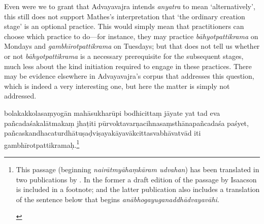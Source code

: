 \documentclass[naipra.tex]{subfiles}
\begin{document}
\begin{sanskrit}
{\begin{english}
	Even were we to grant that Advayavajra intends \emph{anyatra} to mean `alternatively', this still does not support Mathes's interpretation that `the ordinary creation stage' is an optional practice.
	This would simply mean that practitioners can choose which practice to do—for instance, they may practice \emph{bāhyotpattikrama} on Mondays and \emph{gambhīrotpattikrama} on Tuesdays; but that does not tell us whether or not \emph{bāhyotpattikrama} is a necessary prerequisite for the subsequent stages, much less about the kind initiation required to engage in these practices.
	There may be evidence elsewhere in Advayavajra's corpus that addresses this question, which is indeed a very interesting one, but here the matter is simply not addressed.
\end{english}} bolakakkolasaṃyogān mahāsukharūpi  bodhicittaṃ jāyate yat tad eva pañcadaśakalātmakaṃ jhaṭiti pūrvoktavarṇacihnasaṃsthānapañcadaśa paśyet,  pañcaskandhacaturdhātuṣaḍviṣayakāyavākcittasvabhāvatvād iti gambhīrotpattikramaḥ.\footnote{\begin{english}
	This passage (beginning \emph{nairātmyāhaṃkāram udvahan}) has been translated in two publications by \textcites[373–4]{mathes2014}[132-3]{mathes2021}.
	In the former a draft edition of the passage by \textsf{Isaacson} is included in a footnote; and the latter publication also includes a translation of the sentence below that begins \emph{anābhogayuganaddhādvayavāhi}.
\end{english}}
\pend 




\end{sanskrit}
\end{document}
